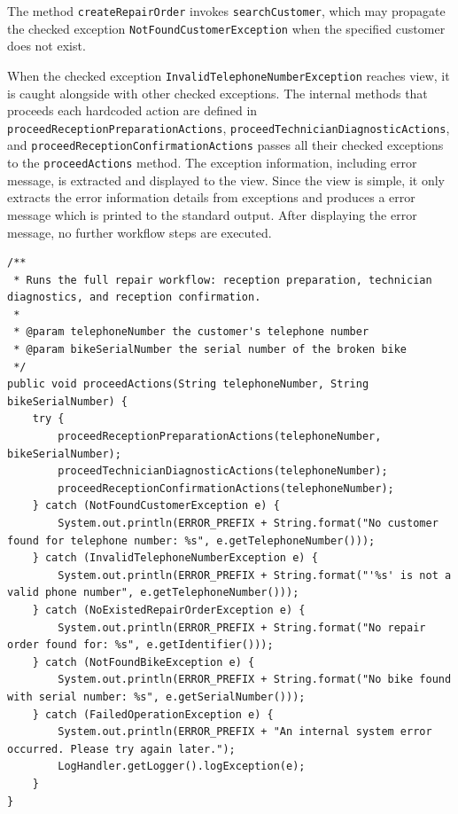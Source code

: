 \documentclass[a4paper]{scrartcl}
\begin{document}
The method \texttt{createRepairOrder} invokes \texttt{searchCustomer}, which may propagate the checked exception \texttt{NotFoundCustomerException} when the specified customer does not exist.

When the checked exception \texttt{InvalidTelephoneNumberException} reaches view, it is caught alongside with other checked exceptions. The internal methods that proceeds each hardcoded action are defined in \texttt{proceedReceptionPreparationActions}, \texttt{proceedTechnicianDiagnosticActions}, and \texttt{proceedReceptionConfirmationActions} passes all their checked exceptions to the \texttt{proceedActions} method. The exception information, including error message, is extracted and displayed to the view. Since the view is simple, it only extracts the error information details from exceptions and produces a error message which is printed to the standard output. After displaying the error message, no further workflow steps are executed.

\begin{lstlisting}[style=javastyle, caption={View.proceedActions catching exceptions and displaying error messages}]
/**
 * Runs the full repair workflow: reception preparation, technician diagnostics, and reception confirmation.
 *
 * @param telephoneNumber the customer's telephone number
 * @param bikeSerialNumber the serial number of the broken bike
 */
public void proceedActions(String telephoneNumber, String bikeSerialNumber) {
    try {
        proceedReceptionPreparationActions(telephoneNumber, bikeSerialNumber);
        proceedTechnicianDiagnosticActions(telephoneNumber);
        proceedReceptionConfirmationActions(telephoneNumber);
    } catch (NotFoundCustomerException e) {
        System.out.println(ERROR_PREFIX + String.format("No customer found for telephone number: %s", e.getTelephoneNumber()));
    } catch (InvalidTelephoneNumberException e) {
        System.out.println(ERROR_PREFIX + String.format("'%s' is not a valid phone number", e.getTelephoneNumber()));
    } catch (NoExistedRepairOrderException e) {
        System.out.println(ERROR_PREFIX + String.format("No repair order found for: %s", e.getIdentifier()));
    } catch (NotFoundBikeException e) {
        System.out.println(ERROR_PREFIX + String.format("No bike found with serial number: %s", e.getSerialNumber()));
    } catch (FailedOperationException e) {
        System.out.println(ERROR_PREFIX + "An internal system error occurred. Please try again later.");
        LogHandler.getLogger().logException(e);
    }
}
\end{lstlisting}
\end{document}
